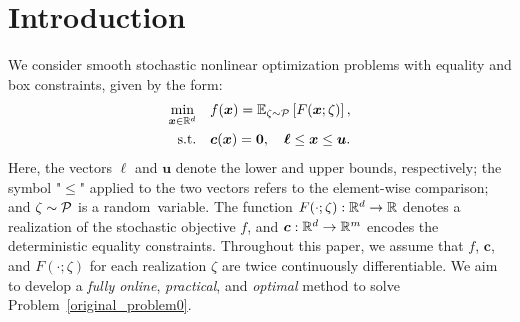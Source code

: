 \documentclass[aos]{imsart}
\numberwithin{equation}{section}
\theoremstyle{plain}
\begin{document}
\begin{frontmatter}
\begin{keyword}
\end{keyword}

\end{frontmatter}




\section{Introduction}

We consider smooth stochastic nonlinear optimization problems with equality and box constraints, given by the form:
\begin{equation}
\label{original_problem0}
	\begin{split}
		\min_{\bm{x} \in \mathbb{R}^{d}} & \hspace{1em} f(\bm{x}) = \mathbb{E}_{\zeta \sim \P} \left[ F(\bm{x}; \zeta) \right], \\
		\text{s.t.} & \hspace{1em} \bm{c}(\bm{x}) = \bm{0},\quad \bm{\ell} \leq \bm{x} \leq \bm{u}.
	\end{split}
\end{equation}
Here, the vectors $\bm{\ell}$ and $\bm{u}$ denote the lower and upper bounds, respectively; the symbol "$\leq$" applied to the two vectors refers to the element-wise comparison; and $\zeta\sim\P$ is a random~variable. The function $F(\cdot; \zeta):\mR^d\rightarrow \mR$ denotes a realization of the stochastic objective $f$, and $\bm{c}:\mR^d\rightarrow\mR^m$ encodes the deterministic equality constraints. 
Throughout this paper, we assume that $f$, $\bm{c}$, and $F(\cdot; \zeta)$ for each realization $\zeta$ are twice continuously differentiable. We aim to develop a \textit{fully online}, \textit{practical}, and \textit{optimal} method to solve Problem~\eqref{original_problem0}.
\end{document}
